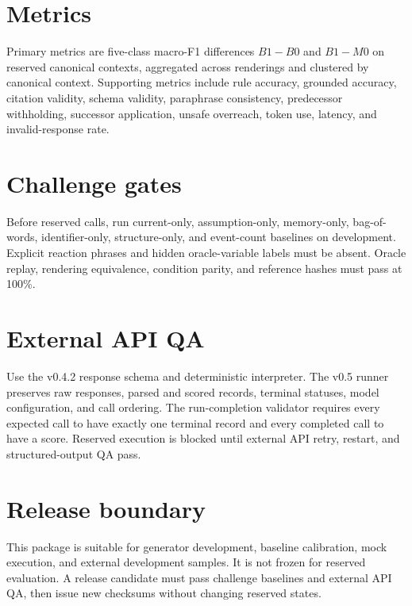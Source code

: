 \documentclass[10.5pt]{article}\usepackage[margin=.85in]{geometry}\usepackage[T1]{fontenc}\usepackage{lmodern,microtype,booktabs,longtable,amsmath,xcolor,hyperref,fancyhdr}
\begin{document}
\section{Metrics}Primary metrics are five-class macro-F1 differences $B1-B0$ and $B1-M0$ on reserved canonical contexts, aggregated across renderings and clustered by canonical context. Supporting metrics include rule accuracy, grounded accuracy, citation validity, schema validity, paraphrase consistency, predecessor withholding, successor application, unsafe overreach, token use, latency, and invalid-response rate.
\section{Challenge gates}Before reserved calls, run current-only, assumption-only, memory-only, bag-of-words, identifier-only, structure-only, and event-count baselines on development. Explicit reaction phrases and hidden oracle-variable labels must be absent. Oracle replay, rendering equivalence, condition parity, and reference hashes must pass at 100\%.
\section{External API QA}Use the v0.4.2 response schema and deterministic interpreter. The v0.5 runner preserves raw responses, parsed and scored records, terminal statuses, model configuration, and call ordering. The run-completion validator requires every expected call to have exactly one terminal record and every completed call to have a score. Reserved execution is blocked until external API retry, restart, and structured-output QA pass.
\section{Release boundary}This package is suitable for generator development, baseline calibration, mock execution, and external development samples. It is not frozen for reserved evaluation. A release candidate must pass challenge baselines and external API QA, then issue new checksums without changing reserved states.
\end{document}
